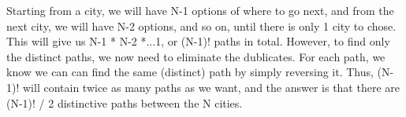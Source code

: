 \documentclass{article}
\begin{document}
 
Starting from a city, we will have N-1 options of where to go next, and from the next city, we will have N-2 options, and so on, until there is only 1 city to chose. This will give us N-1 * N-2 *...1, or (N-1)! paths in total. However, to find only the distinct paths, we now need to eliminate the dublicates. For each path, we know we can can find the same (distinct) path by simply reversing it. Thus, (N-1)! will contain twice as many paths as we want, and the answer is that there are (N-1)! / 2 distinctive paths between the N cities.
\end{document}

